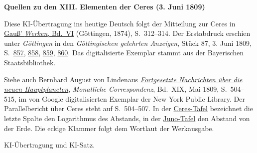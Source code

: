 \clearpage\thispagestyle{empty}
\begin{center}\textbf{Quellen zu den XIII. Elementen der Ceres (3. Juni 1809)}\end{center}
\noindent Diese KI-Übertragung ins heutige Deutsch folgt der Mitteilung zur Ceres in \href{https://gdz.sub.uni-goettingen.de/id/PPN236007467}{Gauß’ \textit{Werken}, Bd.~VI} (Göttingen, 1874), S.~312--314. Der Erstabdruck erschien unter \textit{Göttingen} in den \textit{Göttingischen gelehrten Anzeigen}, Stück 87, 3. Juni 1809, S.~\href{https://api.digitale-sammlungen.de/iiif/image/v2/bsb10538675_00859/full/1600,/0/default.jpg}{857}, \href{https://api.digitale-sammlungen.de/iiif/image/v2/bsb10538675_00860/full/1600,/0/default.jpg}{858}, \href{https://api.digitale-sammlungen.de/iiif/image/v2/bsb10538675_00861/full/1600,/0/default.jpg}{859}, \href{https://api.digitale-sammlungen.de/iiif/image/v2/bsb10538675_00862/full/1600,/0/default.jpg}{860}. Das digitalisierte Exemplar stammt aus der Bayerischen Staatsbibliothek.
\par\smallskip\noindent Siehe auch Bernhard August von Lindenaus \href{https://archive.org/download/bub_gb_caMAAAAAMAAJ/page/n518.jpg}{\textit{Fortgesetzte Nachrichten über die neuen Hauptplaneten}}, \textit{Monatliche Correspondenz}, Bd.~XIX, Mai 1809, S.~504--515, im von Google digitalisierten Exemplar der New York Public Library. Der Parallelbericht über Ceres steht auf S.~504--507. In der \href{https://archive.org/download/bub_gb_caMAAAAAMAAJ/page/n525.jpg}{Ceres-Tafel} bezeichnet die letzte Spalte den Logarithmus des Abstands, in der \href{https://archive.org/download/bub_gb_caMAAAAAMAAJ/page/n526.jpg}{Juno-Tafel} den Abstand von der Erde. Die eckige Klammer folgt dem Wortlaut der Werkausgabe.
\par\smallskip\noindent KI-Übertragung und KI-Satz.
\clearpage

